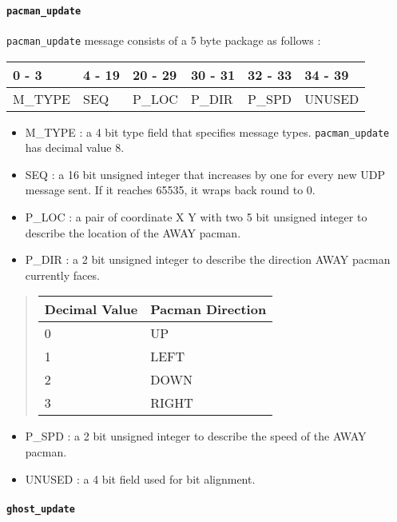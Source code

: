 \documentclass[]{article}
\let\oldparagraph\paragraph
\renewcommand{\paragraph}[1]{\oldparagraph{#1}\mbox{}}
\begin{document}
\hypertarget{pacman_update}{%
\paragraph{\texorpdfstring{\texttt{pacman\_update}}{pacman\_update}}\label{pacman_update}}

\texttt{pacman\_update} message consists of a 5 byte package as follows
:

\begin{longtable}[]{@{}llllll@{}}
\toprule
0 - 3 & 4 - 19 & 20 - 29 & 30 - 31 & 32 - 33 & 34 - 39\tabularnewline
\midrule
\endhead
M\_TYPE & SEQ & P\_LOC & P\_DIR & P\_SPD & UNUSED\tabularnewline
\bottomrule
\end{longtable}

\begin{itemize}
\item
  M\_TYPE : a 4 bit type field that specifies message types.
  \texttt{pacman\_update} has decimal value 8.
\item
  SEQ : a 16 bit unsigned integer that increases by one for every new
  UDP message sent. If it reaches 65535, it wraps back round to 0.
\item
  P\_LOC : a pair of coordinate X Y with two 5 bit unsigned integer to
  describe the location of the AWAY pacman.
\item
  P\_DIR : a 2 bit unsigned integer to describe the direction AWAY
  pacman currently faces.
\end{itemize}

\begin{quote}
\begin{longtable}[]{@{}ll@{}}
\toprule
Decimal Value & Pacman Direction\tabularnewline
\midrule
\endhead
0 & UP\tabularnewline
1 & LEFT\tabularnewline
2 & DOWN\tabularnewline
3 & RIGHT\tabularnewline
\bottomrule
\end{longtable}
\end{quote}

\begin{itemize}
\item
  P\_SPD : a 2 bit unsigned integer to describe the speed of the AWAY
  pacman.
\item
  UNUSED : a 4 bit field used for bit alignment.
\end{itemize}

\hypertarget{ghost_update}{%
\paragraph{\texorpdfstring{\texttt{ghost\_update}}{ghost\_update}}\label{ghost_update}}
\end{document}
